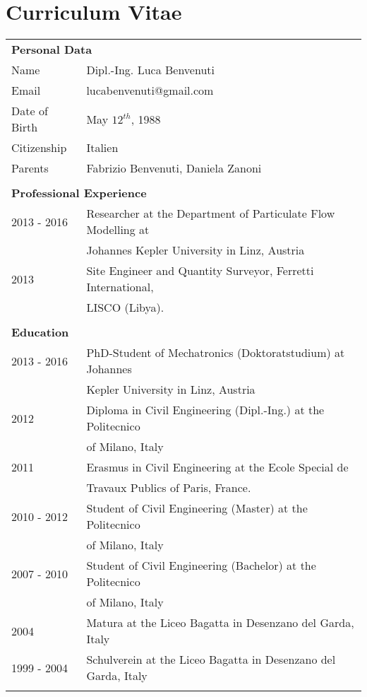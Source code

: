 \chapter*{Curriculum Vitae}

\setlength\extrarowheight{5pt}

\begin{longtable}[t]{ll}
	\multicolumn{2}{l}{\textbf{\Large Personal Data}} \\
	Name & Dipl.-Ing. Luca Benvenuti \\
	Email & lucabenvenuti@gmail.com \\
	Date of Birth & May $12^{th}$, 1988 \\
	Citizenship & Italien \\
	Parents & Fabrizio Benvenuti, Daniela Zanoni \\
	\vspace*{1ex} \\ 
	\multicolumn{2}{l}{\textbf{\Large Professional Experience}} \\
	2013 - 2016 & Researcher at the Department of Particulate Flow Modelling at \\
				&		Johannes Kepler University in Linz, Austria \\
	2013 		& Site Engineer and Quantity Surveyor, Ferretti International, \\
		 		& LISCO (Libya). \\
	\vspace*{1ex} \\
	\multicolumn{2}{l}{\textbf{\Large Education}} \\
	2013 - 2016 & PhD-Student of Mechatronics (Doktoratstudium) at Johannes \\
				& Kepler University in Linz, Austria \\
	2012 		& Diploma in Civil Engineering (Dipl.-Ing.) at the Politecnico \\
				& of Milano, Italy \\
	2011		& Erasmus in Civil Engineering at the Ecole Special de \\
				& Travaux Publics of Paris, France. \\
	2010 - 2012 & Student of Civil Engineering (Master) at the Politecnico \\
				& of Milano, Italy \\
	2007 - 2010 & Student of Civil Engineering (Bachelor) at the Politecnico \\
				& of Milano, Italy \\				
	2004 		& Matura at the Liceo Bagatta in Desenzano del Garda, Italy \\
	1999 - 2004 & Schulverein at the Liceo Bagatta in Desenzano del Garda, Italy \\	
	\vspace*{1ex} \\
\end{longtable}
